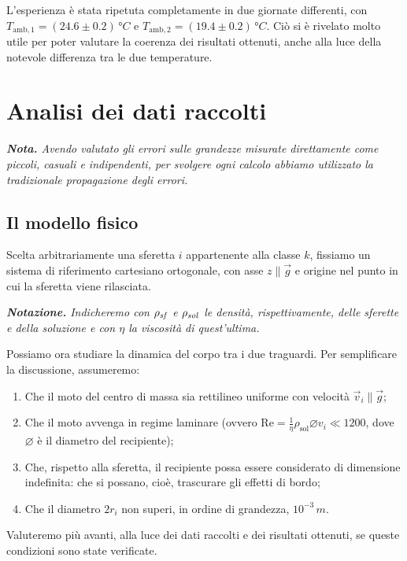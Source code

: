 \documentclass{article}
\newcommand*{\diam}{\varnothing}
\begin{document}
L'esperienza è stata ripetuta completamente in due giornate differenti,
con $T_{\text{amb},1} = (24.6\pm0.2)\,\unit{\degree C}$
e $T_{\text{amb},2} = (19.4\pm0.2)\,\unit{\degree C}$.
Ciò si è rivelato molto utile per poter valutare la
coerenza dei risultati ottenuti, anche alla luce della
notevole differenza tra le due temperature.


\section{Analisi dei dati raccolti}
\emph{\textbf{Nota.}
Avendo valutato gli errori sulle grandezze misurate direttamente
come piccoli, casuali e indipendenti, per svolgere ogni calcolo
abbiamo utilizzato la tradizionale propagazione degli errori.
}

\subsection{Il modello fisico}

Scelta arbitrariamente una sferetta $i$ appartenente alla classe $k$,
fissiamo un sistema di riferimento cartesiano ortogonale, con asse
$z\parallel\vec{g}$ e origine nel punto in cui la sferetta viene rilasciata.

\vspace{2mm}
\emph{
  \textbf{Notazione.} Indicheremo con $\rho_\text{\emph{sf}}$ e
  $\rho_\text{\emph{sol}}$ le densità, rispettivamente, delle sferette
  e della soluzione e con $\eta$ la viscosità di quest'ultima.
}
\vspace{2mm}

Possiamo ora studiare la dinamica del corpo tra i due traguardi.
Per semplificare la discussione, assumeremo:
\begin{enumerate}
  \item Che il moto del centro di massa sia rettilineo uniforme con velocità
    $\vec{v}_i\parallel\vec{g}$;
  \item Che il moto avvenga in regime laminare
    (ovvero $\text{Re}=\frac{1}{\eta}\rho_\text{sol}\diam v_i \ll 1200$,
     dove $\diam$ è il diametro del recipiente);
  \item Che, rispetto alla sferetta, il recipiente possa essere
    considerato di dimensione indefinita: che si possano, cioè,
    trascurare gli effetti di bordo;
  \item Che il diametro $2r_i$ non superi, in ordine di grandezza,
    $10^{-3}\,\unit{m}$.
\end{enumerate}
Valuteremo più avanti, alla luce dei dati raccolti e dei risultati ottenuti,
se queste condizioni sono state verificate.
\end{document}
